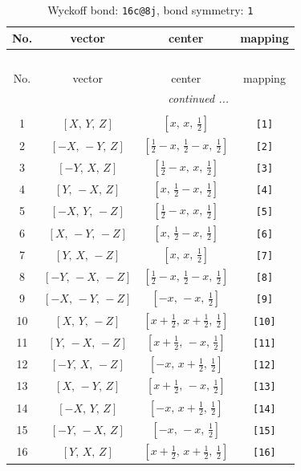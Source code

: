 \documentclass[fleqn,8pt]{jsarticle}
\begin{document}
\begin{longtable}{cccc}
\caption{Wyckoff bond: {\tt 16c@8j}, bond symmetry: {\tt 1}}
 \\
 \hline \hline
No. & vector & center & mapping \\ \hline \endfirsthead

\multicolumn{3}{l}{\tablename\ \thetable{}} \\
 \hline \hline
No. & vector & center & mapping \\ \hline \endhead

 \hline \hline
\multicolumn{3}{r}{\footnotesize\it continued ...} \\ \endfoot

 \hline \hline
\multicolumn{3}{r}{} \\ \endlastfoot

1 & $\left[ X,\, Y,\, Z \right]$ & $\left[ x,\, x,\, \frac{1}{2} \right]$ & {\tt [1]} \\ \hline
2 & $\left[ - X,\, - Y,\, Z \right]$ & $\left[ \frac{1}{2} - x,\, \frac{1}{2} - x,\, \frac{1}{2} \right]$ & {\tt [2]} \\ \hline
3 & $\left[ - Y,\, X,\, Z \right]$ & $\left[ \frac{1}{2} - x,\, x,\, \frac{1}{2} \right]$ & {\tt [3]} \\ \hline
4 & $\left[ Y,\, - X,\, Z \right]$ & $\left[ x,\, \frac{1}{2} - x,\, \frac{1}{2} \right]$ & {\tt [4]} \\ \hline
5 & $\left[ - X,\, Y,\, - Z \right]$ & $\left[ \frac{1}{2} - x,\, x,\, \frac{1}{2} \right]$ & {\tt [5]} \\ \hline
6 & $\left[ X,\, - Y,\, - Z \right]$ & $\left[ x,\, \frac{1}{2} - x,\, \frac{1}{2} \right]$ & {\tt [6]} \\ \hline
7 & $\left[ Y,\, X,\, - Z \right]$ & $\left[ x,\, x,\, \frac{1}{2} \right]$ & {\tt [7]} \\ \hline
8 & $\left[ - Y,\, - X,\, - Z \right]$ & $\left[ \frac{1}{2} - x,\, \frac{1}{2} - x,\, \frac{1}{2} \right]$ & {\tt [8]} \\ \hline
9 & $\left[ - X,\, - Y,\, - Z \right]$ & $\left[ - x,\, - x,\, \frac{1}{2} \right]$ & {\tt [9]} \\ \hline
10 & $\left[ X,\, Y,\, - Z \right]$ & $\left[ x + \frac{1}{2},\, x + \frac{1}{2},\, \frac{1}{2} \right]$ & {\tt [10]} \\ \hline
11 & $\left[ Y,\, - X,\, - Z \right]$ & $\left[ x + \frac{1}{2},\, - x,\, \frac{1}{2} \right]$ & {\tt [11]} \\ \hline
12 & $\left[ - Y,\, X,\, - Z \right]$ & $\left[ - x,\, x + \frac{1}{2},\, \frac{1}{2} \right]$ & {\tt [12]} \\ \hline
13 & $\left[ X,\, - Y,\, Z \right]$ & $\left[ x + \frac{1}{2},\, - x,\, \frac{1}{2} \right]$ & {\tt [13]} \\ \hline
14 & $\left[ - X,\, Y,\, Z \right]$ & $\left[ - x,\, x + \frac{1}{2},\, \frac{1}{2} \right]$ & {\tt [14]} \\ \hline
15 & $\left[ - Y,\, - X,\, Z \right]$ & $\left[ - x,\, - x,\, \frac{1}{2} \right]$ & {\tt [15]} \\ \hline
16 & $\left[ Y,\, X,\, Z \right]$ & $\left[ x + \frac{1}{2},\, x + \frac{1}{2},\, \frac{1}{2} \right]$ & {\tt [16]} \\
\end{longtable}
\end{document}
